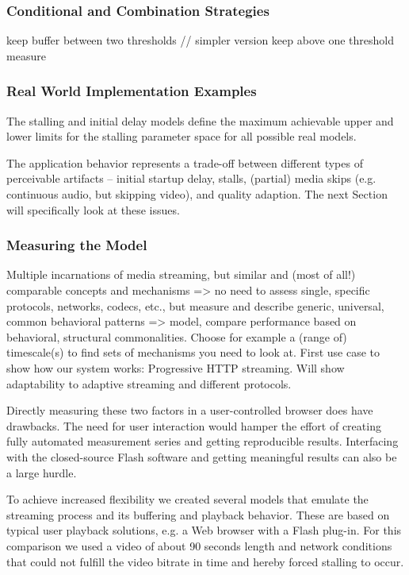 \subsubsection{Conditional and Combination Strategies}

    keep buffer between two thresholds // simpler version keep above one threshold
    measure


\subsubsection{Real World Implementation Examples}

The stalling and initial delay models define the maximum achievable upper and lower limits for the stalling parameter space for all possible real models.

The application behavior represents a trade-off between different types of perceivable artifacts -- initial startup delay, stalls, (partial) media skips (e.g. continuous audio, but skipping video), and quality adaption. The next Section will specifically look at these issues.

\subsubsection{Measuring the Model}

   Multiple incarnations of media streaming, but similar and (most of all!) comparable concepts and mechanisms => no need to assess single, specific protocols, networks, codecs, etc., but measure and describe generic, universal, common behavioral patterns => model, compare performance based on behavioral, structural commonalities. Choose for example a (range of) timescale(s) to find sets of mechanisms you need to look at. First use case to show how our system works: Progressive HTTP streaming. Will show adaptability to adaptive streaming and different protocols.

Directly measuring these two factors in a user-controlled browser does have drawbacks. The need for user interaction would hamper the effort of creating fully automated measurement series and getting reproducible results. Interfacing with the closed-source Flash software and getting meaningful results can also be a large hurdle.

To achieve increased flexibility we created several models that emulate the streaming process and its buffering and playback behavior. These are based on typical user playback solutions, e.g. a Web browser with a Flash plug-in. For this comparison we used a video of about 90 seconds length and network conditions that could not fulfill the video bitrate in time and hereby forced stalling to occur.


